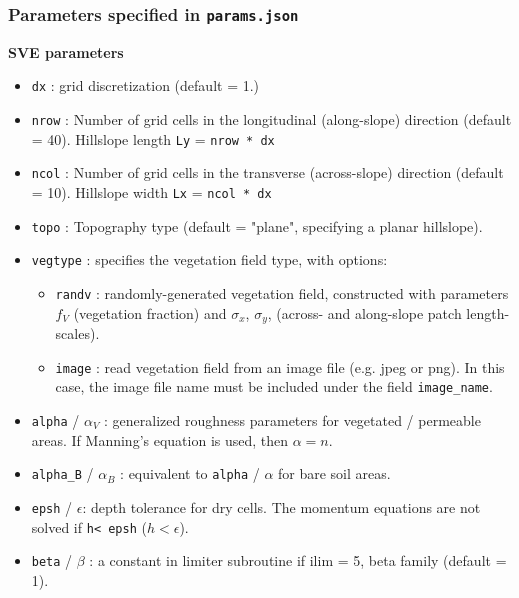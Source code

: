 \documentclass{article}
\newcommand{\code}[1]{\texttt{#1}}
\begin{document}
\subsubsection{Parameters specified in \code{params.json} }
\textbf{SVE parameters}
\begin{itemize}
	\item \code{dx} : grid discretization (default = 1.)  
	\item \code{nrow} :  Number of grid cells in the longitudinal (along-slope) direction (default = 40).
		\subitem Hillslope length \code{Ly} = \code{nrow * dx} 
	\item \code{ncol} :  Number of grid cells in the transverse (across-slope) direction (default = 10).
	 	\subitem Hillslope width \code{Lx} = \code{ncol * dx} 
	 	
	\item \code{topo} : Topography type (default = "plane", specifying a planar hillslope). 

	\item \code{vegtype} : specifies the vegetation field type, with options:
		\begin{itemize}
		\item \code{randv} : randomly-generated vegetation field, constructed with parameters $f_V$ (vegetation fraction) and $\sigma_x$, $\sigma_y$, (across- and along-slope patch length-scales).
	    \item \code{image} : read vegetation field from an image file (e.g. jpeg or png). In this case, the image file name must be included under the field \code{image\_name}.
		\end{itemize}
	\item \code{alpha} / $\alpha_V$ : generalized roughness parameters for vegetated / permeable areas. If Manning's equation is used, then  $\alpha = n$.
	\item \code{alpha\_B} / $\alpha_B$ : equivalent to \code{alpha} / $\alpha$   for bare soil areas.
	\item \code{epsh} / $\epsilon$: depth tolerance for dry cells.  The momentum equations are not solved if \code{h< epsh} ($h<\epsilon$).
	\item \code{beta} / $\beta$ : a constant in limiter subroutine if ilim = 5, beta family (default = 1).   
\end{itemize}
\end{document}
